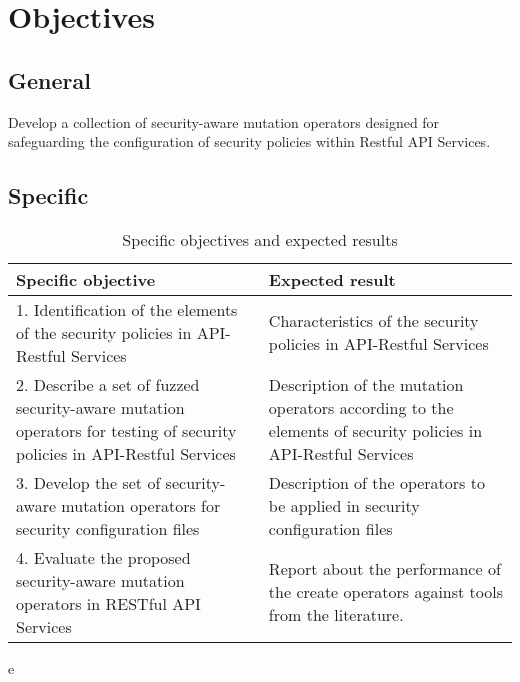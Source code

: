 \section{Objectives}

\subsection{General}

Develop a collection of security-aware mutation operators designed for safeguarding the configuration of security policies within Restful API Services.
\subsection{Specific}

\begin{table}[H]
    \centering
    \begin{tabular}{|p{}|p{}|}
        \hline
         \textbf{Specific objective} & \textbf{Expected result} \\ \hline
         1.  Identification of the elements of the security policies in API-Restful Services &  Characteristics of the security policies in API-Restful Services  \\  \hline
         2. Describe a set of fuzzed security-aware mutation operators for testing of security policies in API-Restful  Services & Description of the mutation operators according to the elements of security policies in API-Restful Services  \\  \hline
         3. Develop the set of security-aware mutation operators for security configuration files  & Description of the operators to be applied in security configuration files \\  \hline
         4. Evaluate the proposed security-aware mutation operators in RESTful API Services & Report about the performance of the create operators against tools from the literature.
         \\ \hline
    \end{tabular}
    \caption{Specific objectives and expected results} e
    \label{tab:objetivos}
\end{table}
